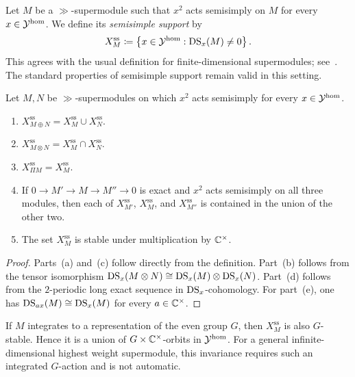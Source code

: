 Let $M$ be a $\gg$-supermodule such that $x^{2}$ acts semisimply on $M$ for every $x\in{\mathcal Y}^{\hom}$. We define its \emph{semisimple support} by
\begin{equation}\label{eq::semisimple_support}
X_{M}^{\mathrm{ss}}
\coloneqq 
\left\{
x\in{\mathcal Y}^{\hom}:\operatorname{DS}_{x}(M)\neq0
\right\}.
\end{equation}
This agrees with the usual definition for finite-dimensional supermodules; see~\cite[Section~10.3]{gorelik2022duflo}. The standard properties of semisimple support remain valid in this setting.

\begin{proposition}\label{prop::semisimple_support_properties}
Let $M,N$ be $\gg$-supermodules on which $x^{2}$ acts semisimply for every $x\in{\mathcal Y}^{\hom}$.
\begin{enumerate}
\item[(a)] $X_{M\oplus N}^{\mathrm{ss}}=X_{M}^{\mathrm{ss}}\cup X_{N}^{\mathrm{ss}}$.

\item[(b)] $X_{M\otimes N}^{\mathrm{ss}}=X_{M}^{\mathrm{ss}}\cap X_{N}^{\mathrm{ss}}$.

\item[(c)] $X_{\Pi M}^{\mathrm{ss}}=X_{M}^{\mathrm{ss}}$.

\item[(d)] If $0\to M'\to M\to M''\to0$ is exact and $x^{2}$ acts semisimply on all three modules, then each of $X_{M'}^{\mathrm{ss}}$, $X_{M}^{\mathrm{ss}}$, and $X_{M''}^{\mathrm{ss}}$ is contained in the union of the other two.

\item[(e)] The set $X_{M}^{\mathrm{ss}}$ is stable under multiplication by ${\mathbb C}^{\times}$.
\end{enumerate}
\end{proposition}

\begin{proof}
Parts~(a) and~(c) follow directly from the definition. Part~(b) follows from the tensor isomorphism $\operatorname{DS}_{x}(M\otimes N)\cong\operatorname{DS}_{x}(M)\otimes\operatorname{DS}_{x}(N)$. Part~(d) follows from the $2$-periodic long exact sequence in $\operatorname{DS}_{x}$-cohomology. For part~(e), one has $\operatorname{DS}_{ax}(M)\cong\operatorname{DS}_{x}(M)$ for every $a\in{\mathbb C}^{\times}$. 
\end{proof}

If $M$ integrates to a representation of the even group $G$, then $X_{M}^{\mathrm{ss}}$ is also $G$-stable. Hence it is a union of $G\times{\mathbb C}^{\times}$-orbits in ${\mathcal Y}^{\hom}$. For a general infinite-dimensional highest weight supermodule, this invariance requires such an integrated $G$-action and is not automatic.

